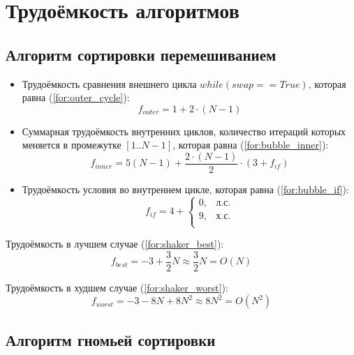 \section{Трудоёмкость алгоритмов}

\subsection{Алгоритм сортировки перемешиванием}

\begin{itemize}
	\item Трудоёмкость сравнения внешнего цикла $while(swap == True)$, которая равна (\ref{for:outer_cycle}):
	\begin{equation}
		\label{for:outer_cycle}
		f_{outer} = 1 + 2 \cdot (N - 1)
	\end{equation}
	\item Суммарная трудоёмкость внутренних циклов, количество итераций которых меняется в промежутке $[1..N-1]$, которая равна (\ref{for:bubble_inner}):
	\begin{equation}
		\label{for:bubble_inner}
		f_{inner} = 5(N - 1) + \frac{2 \cdot (N - 1)}{2} \cdot (3 + f_{if})
	\end{equation}
	\item Трудоёмкость условия во внутреннем цикле, которая равна (\ref{for:bubble_if}):
	\begin{equation}
		\label{for:bubble_if}
		f_{if} = 4 + \begin{cases}
			0, & \text{л.с.}\\
			9, & \text{х.с.}\\
		\end{cases}
	\end{equation}
\end{itemize}

Трудоёмкость в лучшем случае (\ref{for:shaker_best}):
\begin{equation}
	\label{for:shaker_best}
	f_{best} = -3 + \frac{3}{2} N \approx \frac{3}{2} N = O(N)
\end{equation}

Трудоёмкость в худшем случае (\ref{for:shaker_worst}):
\begin{equation}
	\label{for:shaker_worst}
	f_{worst} = -3 - 8N + 8N^2 \approx 8N^2 = O(N^2)
\end{equation}


\subsection{Алгоритм гномьей сортировки}

